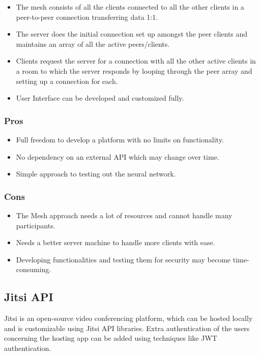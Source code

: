 \begin{itemize}
    \item The mesh consists of all the clients connected to all the other clients in a peer-to-peer connection transferring data 1:1.
    \item The server does the initial connection set up amongst the peer clients and maintains an array of all the active peers/clients.
    \item Clients request the server for a connection with all the other active clients in a room to which the server responds by looping through the peer array and setting up a connection for each.
    \item User Interface can be developed and customized fully.
\end{itemize}

\subsubsection{Pros}

\begin{itemize}
    \item Full freedom to develop a platform with no limits on functionality.
    \item No dependency on an external API which may change over time.
    \item Simple approach to testing out the neural network.
\end{itemize}

\subsubsection{Cons}

\begin{itemize}
    \item The Mesh approach needs a lot of resources and cannot handle many participants.
    \item Needs a better server machine to handle more clients with ease.
    \item Developing functionalities and testing them for security may become time-consuming.
\end{itemize}

\subsection{Jitsi API}
Jitsi is an open-source video conferencing platform, which can be hosted locally and is customizable using Jitsi API libraries.
Extra authentication of the users concerning the hosting app can be added using techniques like JWT authentication.

